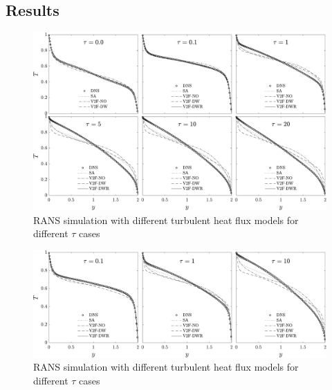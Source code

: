 \documentclass[10pt]{article}
\begin{document}
\subsection*{Results}

\begin{figure}[h]
\centering
\includegraphics[width=1.1\textwidth]{../solution/Figures/Tempgrey.pdf}
\caption{\noindent RANS simulation with different turbulent heat flux models for different $\tau$ cases}
\label{constk}
\end{figure}

\begin{figure}[h]
\centering
\includegraphics[width=1.1\textwidth]{../solution/Figures_r/Tempvar.pdf}
\caption{\noindent RANS simulation with different turbulent heat flux models for different $\tau$ cases}
\label{vark}
\end{figure}
\end{document}
